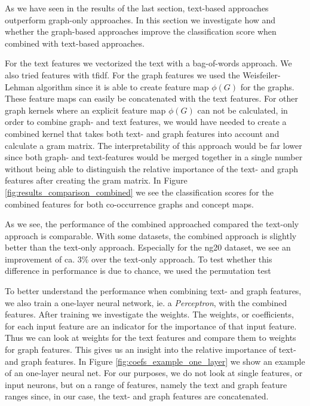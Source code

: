 As we have seen in the results of the last section, text-based approaches outperform graph-only approaches.
In this section we investigate how and whether the graph-based approaches improve the classification score when combined with text-based approaches.

For the text features we vectorized the text with a bag-of-words approach. We also tried features with tfidf.
For the graph features we used the Weisfeiler-Lehman algorithm since it is able to create feature map $\phi(G)$ for the graphs.
These feature maps can easily be concatenated with the text features.
For other graph kernels where an explicit feature map $\phi(G)$ can not be calculated, in order to combine graph- and text features, we would have needed to create a combined kernel that takes both text- and graph features into account and calculate a gram matrix.
The interpretability of this approach would be far lower since both graph- and text-features would be merged together in a single number without being able to distinguish the relative importance of the text- and graph features after creating the gram matrix.
In Figure \ref{fig:results_comparison_combined} we see the classification scores for the combined features for both co-occurrence graphs and concept maps.

As we see, the performance of the combined approached compared the text-only approach is comparable.
With some datasets, the combined approach is slightly better than the text-only approach. Especially for the ng20 dataset, we see an improvement of ca. 3\% over the text-only approach.
To test whether this difference in performance is due to chance, we used the permutation test

To better understand the performance when combining text- and graph features, we also train a one-layer neural network, ie. a \textit{Perceptron}, with the combined features. After training we investigate the weights.
The weights, or coefficients, for each input feature are an indicator for the importance of that input feature.
Thus we can look at weights for the text features and compare them to weights for graph features.
This gives us an insight into the relative importance of text- and graph features.
In Figure \ref{fig:coefs_example_one_layer} we show an example of an one-layer neural net.
For our purposes, we do not look at single features, or input neurons, but on a range of features, namely the text and graph feature ranges since, in our case, the text- and graph features are concatenated.

